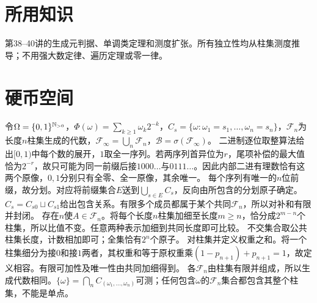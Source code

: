\documentclass[UTF8,fontset=fandol,11pt]{ctexart}
\begin{document}
\section*{所用知识}
第38--40讲的生成元判据、单调类定理和测度扩张。所有独立性均从柱集测度推导；不用强大数定律、遍历定理或零一律。
\section{硬币空间}
令$\Omega=\{0,1\}^{\mathbb N_{>0}}$，$\Phi(\omega)=\sum_{k\ge1}\omega_k2^{-k}$，$C_s=\{\omega:\omega_1=s_1,\ldots,\omega_n=s_n\}$，$\mathcal F_n$为长度$n$柱集生成的代数，$\mathcal F_\infty=\bigcup_n\mathcal F_n$，$\mathcal B=\sigma(\mathcal F_\infty)$。
二进制逐位取整算法给出$[0,1)$中每个数的展开，$1$取全一序列。若两序列首异位为$r$，尾项补偿的最大值恰为$2^{-r}$，故只可能为同一前缀后接$1000\ldots$与$0111\ldots$。因此内部二进有理数恰有这两个原像，$0,1$分别只有全零、全一原像，其余唯一。
每个序列有唯一的$n$位前缀，故分划。对应将前缀集合$E$送到$\bigcup_{s\in E}C_s$，反向由所包含的分划原子确定。
$C_s=C_{s0}\sqcup C_{s1}$给出包含关系。有限多个成员都属于某个共同$\mathcal F_n$，所以对补和有限并封闭。
存在$n$使$A\in\mathcal F_n$。将每个长度$n$柱集加细至长度$m\ge n$，恰分成$2^{m-n}$个柱集，所以比值不变。任意两种表示加细到共同长度即可比较。
不交集合取公共柱集长度，计数相加即可；全集恰有$2^n$个原子。
对柱集并定义权重之和。将一个柱集细分为接$0$和接$1$两者，其权重和等于原权重乘$(1-p_{n+1})+p_{n+1}=1$，故定义相容。有限可加性及唯一性由共同加细得到。
各$\mathcal F_n$由柱集有限并组成，所以生成代数相同。$\{\omega\}=\bigcap_nC_{(\omega_1,\ldots,\omega_n)}$可测；任何包含$\omega$的$\mathcal F_n$集合都包含其整个柱集，不能是单点。
\end{document}
